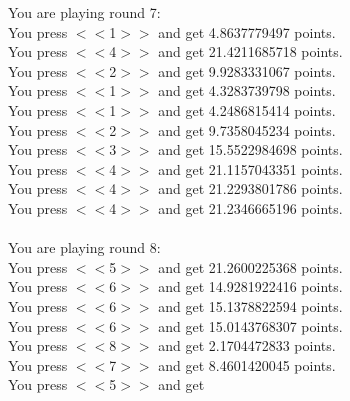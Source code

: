 \documentclass[pdflatex,sn-nature]{sn-jnl}%
\theoremstyle{thmstyleone}%
\theoremstyle{thmstyletwo}%
\theoremstyle{thmstylethree}%
\begin{document}
You are playing round 7: $~$\\ 
You press $<<$1$>>$ and get 4.8637779497 points. $~$\\ 
You press $<<$4$>>$ and get 21.4211685718 points. $~$\\ 
You press $<<$2$>>$ and get 9.9283331067 points. $~$\\ 
You press $<<$1$>>$ and get 4.3283739798 points. $~$\\ 
You press $<<$1$>>$ and get 4.2486815414 points. $~$\\ 
You press $<<$2$>>$ and get 9.7358045234 points. $~$\\ 
You press $<<$3$>>$ and get 15.5522984698 points. $~$\\ 
You press $<<$4$>>$ and get 21.1157043351 points. $~$\\ 
You press $<<$4$>>$ and get 21.2293801786 points. $~$\\ 
You press $<<$4$>>$ and get 21.2346665196 points. $~$\\ 
 $~$\\ 
You are playing round 8: $~$\\ 
You press $<<$5$>>$ and get 21.2600225368 points. $~$\\ 
You press $<<$6$>>$ and get 14.9281922416 points. $~$\\ 
You press $<<$6$>>$ and get 15.1378822594 points. $~$\\ 
You press $<<$6$>>$ and get 15.0143768307 points. $~$\\ 
You press $<<$8$>>$ and get 2.1704472833 points. $~$\\ 
You press $<<$7$>>$ and get 8.4601420045 points. $~$\\ 
You press $<<$5$>>$ and get 
\end{document}
